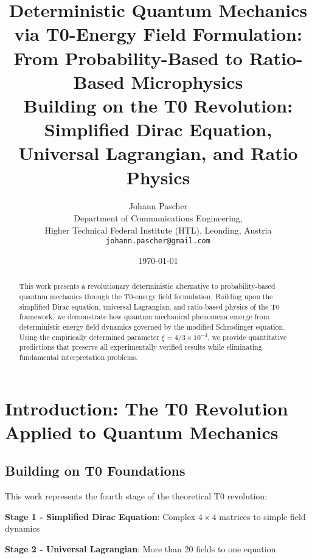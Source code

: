 \documentclass[12pt,a4paper]{article}
\newcommand{\xipar}{\xi}
\begin{document}
	
	\title{Deterministic Quantum Mechanics via T0-Energy Field Formulation: \\
		From Probability-Based to Ratio-Based Microphysics \\
		\large Building on the T0 Revolution: Simplified Dirac Equation, Universal Lagrangian, and Ratio Physics\\
		\textbf{}}
	\author{Johann Pascher\\
		Department of Communications Engineering, \\Higher Technical Federal Institute (HTL), Leonding, Austria\\
		\texttt{johann.pascher@gmail.com}}
	\date{\today}
	
	\maketitle
	
	\begin{abstract}
		This work presents a revolutionary deterministic alternative to probability-based quantum mechanics through the T0-energy field formulation. Building upon the simplified Dirac equation, universal Lagrangian, and ratio-based physics of the T0 framework, we demonstrate how quantum mechanical phenomena emerge from deterministic energy field dynamics governed by the modified Schrodinger equation. Using the empirically determined parameter $\xipar = 4/3 \times 10^{-4}$, we provide quantitative predictions that preserve all experimentally verified results while eliminating fundamental interpretation problems.
	\end{abstract}
	
	\tableofcontents
	\newpage
	
	\section{Introduction: The T0 Revolution Applied to Quantum Mechanics}
	
	\subsection{Building on T0 Foundations}
	
	This work represents the fourth stage of the theoretical T0 revolution:
	
	\textbf{Stage 1 - Simplified Dirac Equation}: Complex $4 \times 4$ matrices to simple field dynamics
	
	\textbf{Stage 2 - Universal Lagrangian}: More than 20 fields to one equation
	
\end{document}
